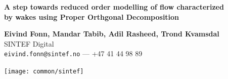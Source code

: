 \documentclass[a0,portrait]{a0poster}
\begin{document}
\begin{minipage}[b]{1.0\linewidth}
  \veryHuge \color{NavyBlue}
  \textbf{
    \noindent A step towards reduced order modelling of flow characterized \\
    by wakes using Proper Orthgonal Decomposition
  }
  \color{Black}\\
\end{minipage}
\begin{minipage}[b]{0.7\linewidth}
  \huge \textbf{Eivind Fonn, Mandar Tabib, Adil Rasheed, Trond Kvamsdal}\\[0.5cm]
  \huge SINTEF Digital\\[0.4cm]
  \Large \texttt{eivind.fonn@sintef.no} --- +47 41 44 98 89\\
\end{minipage}
%
\begin{minipage}[b]{0.25\linewidth}
  \texttt{[image: common/sintef]}\\
\end{minipage}

\vspace{1cm}
\end{document}
